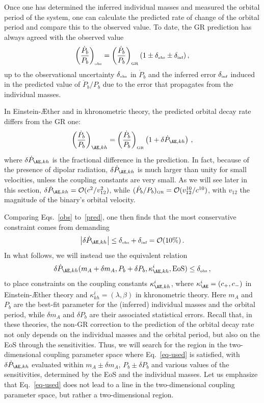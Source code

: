 \documentclass[prd,aps,twocolumn,nofootinbib,showpacs,superscriptaddress]{revtex4-1}
\newcommand\be{\begin{equation}}
\newcommand\ee{\end{equation}}
\newcommand{\GR}{{\mbox{\tiny GR}}}
\newcommand{\obs}{{\mbox{\tiny obs}}}
\newcommand{\inferred}{{\mbox{\tiny inf}}}
\begin{document}
Once one has determined the inferred individual masses and measured the orbital period of the system, one can calculate the predicted rate of change of the orbital period and compare this to the observed value. To date, the GR prediction has always agreed with the observed value
%
\be
\label{obs}
\left(\frac{\dot{P}_{b}}{P_{b}}\right)_{\obs} = \left(\frac{\dot{P}_{b}}{P_{b}}\right)_{\GR} \left(1 \pm \delta_{\obs} \pm \delta_{\inferred}\right),
\ee
%
up to the observational uncertainty $\delta_{\obs}$ in $\dot{P}_{b}$ and the inferred error $\delta_{\inferred}$ induced in the predicted value of $\dot{P}_{b}/P_{b}$ due to the error that propagates from the individual masses.

In Einstein-\AE ther and in khronometric theory, the predicted orbital decay rate differs from the GR one:
%
\be
\label{pred}
\left(\frac{\dot{P}_{b}}{P_{b}}\right)_{\AE,kh} = \left(\frac{\dot{P}_{b}}{P_{b}}\right)_{\GR} \left(1 + \delta \dot{P}_{\AE,kh} \right)\,,
\ee
%
where $\delta \dot{P}_{\AE, kh}$ is the fractional difference in the prediction. In fact, because of the presence of dipolar radiation, $\delta \dot{P}_{\AE,kh}$ is much larger than unity for small velocities, unless the coupling constants are very small. As we will see later in this section, $\delta \dot{P}_{\AE,kh} = {\cal{O}}(c^2/v_{12}^2)$, while $({\dot{P}_{b}}/{P_{b}})_{\GR} = {\cal{O}}(v_{12}^{10}/c^{10})$, with $v_{12}$ the magnitude of the binary's orbital velocity. 

Comparing Eqs.~\eqref{obs} to~\eqref{pred}, one then finds that the most conservative constraint comes from demanding 
%
\be
\left| \delta \dot{P}_{\AE,kh} \right| \leq \delta_{\obs} + \delta_{\inferred} = {\cal{O}}(10 \%)\,.
\ee
%
In what follows, we will instead use the equivalent relation
%
\be
\label{eq-used}
\delta \dot{P}_{\AE,kh}(m_{A}+\delta m_{A}, P_{b} +\delta P_{b}, \kappa^{i}_{\AE,kh},{\rm{EoS}}) \leq \delta_{\obs}\,,
\ee
%
to place constraints on the coupling constants $\kappa^{i}_{\AE,kh}$, where $\kappa^{i}_{\AE} = (c_{+},c_{-})$ in Einstein-\AE ther theory and $\kappa^{i}_{kh} = (\lambda,\beta)$ in khronometric theory. 
Here $m_{A}$ and $P_{b}$ are the best-fit parameter for the (inferred) individual masses and the orbital period, while $\delta m_{A}$ and $\delta P_{b}$ are their associated statistical errors.  Recall that, in these theories, the non-GR correction to the prediction of the orbital decay rate not only depends on the individual masses and the orbital period, but also on the EoS through the sensitivities. Thus, we will search for the region in the two-dimensional coupling parameter space where Eq.~\eqref{eq-used} is satisfied, with $\delta \dot{P}_{\AE,kh}$ evaluated within $m_{A} \pm \delta m_{A}$, $P_{b} \pm \delta P_{b}$ and various values of the sensitivities, determined by the EoS and the individual masses. Let us emphasize that Eq.~\eqref{eq-used} does not lead to a line in the two-dimensional coupling parameter space, but rather a two-dimensional region.
\end{document}
